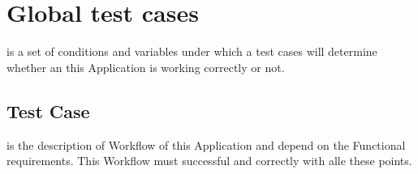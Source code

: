 \section{Global test cases}

is a set of conditions and variables under which a test cases will determine whether an this Application is working correctly 
or not.

\renewcommand{\theenumi}{/T\arabic{enumi}0/}
\renewcommand{\labelenumi}{\theenumi}

\subsection{Test Case}

is the description of Workflow of this Application and depend on the Functional requirements. This Workflow must
successful and correctly with alle these points. 

